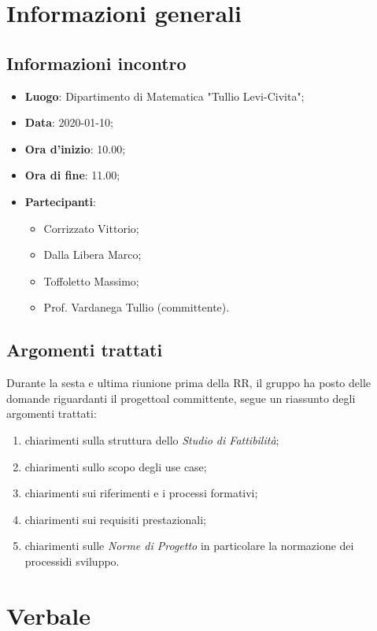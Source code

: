 \section{Informazioni generali}
    \subsection{Informazioni incontro}
        \begin{itemize}
            \item \textbf{Luogo}: Dipartimento di Matematica "Tullio Levi-Civita";
            \item \textbf{Data}: 2020-01-10;
            \item \textbf{Ora d'inizio}: 10.00;
            \item \textbf{Ora di fine}: 11.00;
            \item \textbf{Partecipanti}: \begin{itemize}
                \item Corrizzato Vittorio;
                \item Dalla Libera Marco;
                \item Toffoletto Massimo;
                \item Prof. Vardanega Tullio (committente).
            \end{itemize}
        \end{itemize}
    \subsection{Argomenti trattati}
        Durante la sesta e ultima riunione prima della RR, il gruppo ha posto delle domande riguardanti il progetto\glosp al committente, segue un riassunto degli argomenti trattati:
        \begin{enumerate}
            \item chiarimenti sulla struttura dello \textit{Studio di Fattibilità};
            \item chiarimenti sullo scopo degli use case;
            \item chiarimenti sui riferimenti e i processi formativi;
            \item chiarimenti sui requisiti prestazionali;
            \item chiarimenti sulle \textit{Norme di Progetto} in particolare la normazione dei processi\glosp di sviluppo.
        \end{enumerate}
\section{Verbale}
